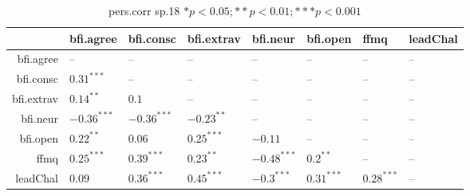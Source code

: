 \begin{table}[ht]
\centering
\begin{tabular}{rlllllll}
  \hline
 & bfi.agree & bfi.consc & bfi.extrav & bfi.neur & bfi.open & ffmq & leadChal \\ 
  \hline
bfi.agree & -- & -- & -- & -- & -- & -- & -- \\ 
  bfi.consc & $0.31^{***}$ & -- & -- & -- & -- & -- & -- \\ 
  bfi.extrav & $0.14^{**}$ & $0.1$ & -- & -- & -- & -- & -- \\ 
  bfi.neur & $-0.36^{***}$ & $-0.36^{***}$ & $-0.23^{**}$ & -- & -- & -- & -- \\ 
  bfi.open & $0.22^{**}$ & $0.06$ & $0.25^{***}$ & $-0.11$ & -- & -- & -- \\ 
  ffmq & $0.25^{***}$ & $0.39^{***}$ & $0.23^{**}$ & $-0.48^{***}$ & $0.2^{**}$ & -- & -- \\ 
  leadChal & $0.09$ & $0.36^{***}$ & $0.45^{***}$ & $-0.3^{***}$ & $0.31^{***}$ & $0.28^{***}$ & -- \\ 
   \hline
\end{tabular}
\caption{pers.corr sp.18 $* p < 0.05; ** p < 0.01; *** p < 0.001$} 
\label{freq_corr.pers.corr.sp.18}
\end{table}

